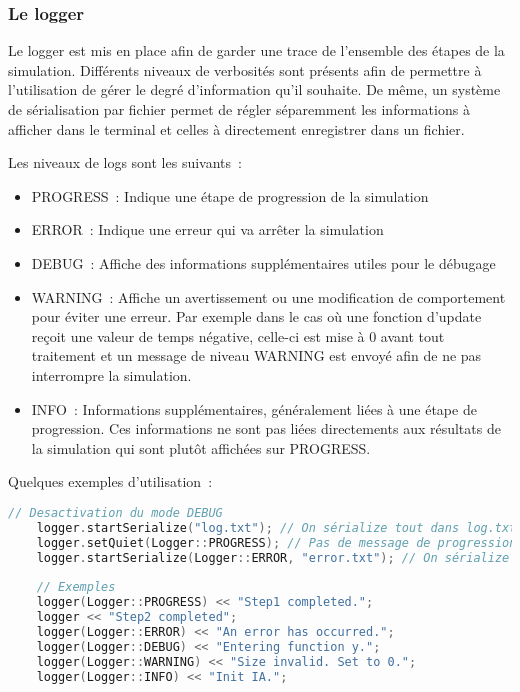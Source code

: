 \subsubsection{Le logger}
Le logger est mis en place afin de garder une trace de l'ensemble des étapes de la simulation. Différents niveaux de verbosités sont présents afin de permettre à l'utilisation de gérer le degré d'information qu'il souhaite. De même, un système de sérialisation par fichier permet de régler séparemment les informations à afficher dans le terminal et celles à directement enregistrer dans un fichier.

Les niveaux de logs sont les suivants~:
\begin{itemize}
\item PROGRESS~: Indique une étape de progression de la simulation
\item ERROR~: Indique une erreur qui va arrêter la simulation
\item DEBUG~: Affiche des informations supplémentaires utiles pour le débugage
\item WARNING~: Affiche un avertissement ou une modification de comportement pour éviter une erreur. Par exemple dans le cas où une fonction d'update reçoit une valeur de temps négative, celle-ci est mise à 0 avant tout traitement et un message de niveau WARNING est envoyé afin de ne pas interrompre la simulation.
\item INFO~: Informations supplémentaires, généralement liées à une étape de progression. Ces informations ne sont pas liées directements aux résultats de la simulation qui sont plutôt affichées sur PROGRESS.\\
\end{itemize}

Quelques exemples d'utilisation~:
\begin{lstlisting}[label=nvi_code, caption=Utilisation du logger, language=C++, inputencoding=utf8]
    // Desactivation du mode DEBUG
    logger.startSerialize("log.txt"); // On sérialize tout dans log.txt
    logger.setQuiet(Logger::PROGRESS); // Pas de message de progression affiché
    logger.startSerialize(Logger::ERROR, "error.txt"); // On sérialize les erreurs à part
        
    // Exemples
    logger(Logger::PROGRESS) << "Step1 completed.";
    logger << "Step2 completed";
    logger(Logger::ERROR) << "An error has occurred.";
    logger(Logger::DEBUG) << "Entering function y.";
    logger(Logger::WARNING) << "Size invalid. Set to 0.";
    logger(Logger::INFO) << "Init IA.";
\end{lstlisting}

